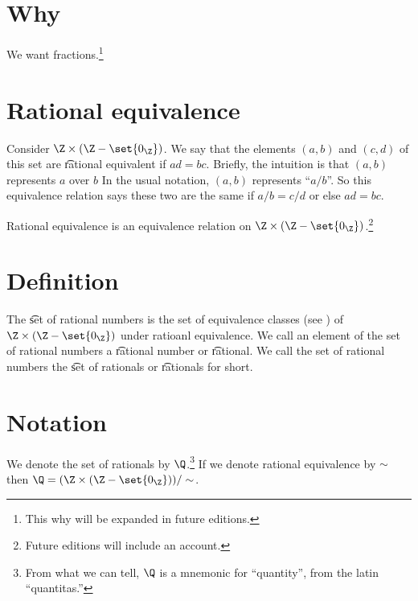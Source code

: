 

\section*{Why}

We want fractions.\footnote{This why will be expanded in future editions.}

\section*{Rational equivalence}

Consider $\Z  \times (\Z  - \set{0_{\Z }})$.
We say that the elements $(a, b)$ and $(c, d)$ of this set are \t{rational equivalent} if $ad = bc$.
Brieﬂy, the intuition is that $(a, b)$ represents $a$ over $b$
In the usual notation, $(a, b)$ represents ``$a/b$''.
So this equivalence relation says these two are the same if $a/b = c/d$ or else $ad= bc$.

\begin{proposition}
Rational equivalence is an equivalence relation on $\Z \times (\Z  - \set{0_{\Z }})$.\footnote{Future editions will include an account.}

\end{proposition}

\section*{Definition}

The \t{set of rational numbers} is the set of equivalence classes (see ) of $\Z  \times (\Z  - \set{0_{\Z }})$ under ratioanl equivalence.
We call an element of the set of rational numbers a \t{rational number} or \t{rational}.
We call the set of rational numbers the \t{set of rationals} or \t{rationals} for short.

\section*{Notation}

We denote the set of rationals by $\Q $.\footnote{From what we can tell, $\Q $ is a mnemonic for ``quantity'', from the latin ``quantitas.''}
If we denote rational equivalence by $\sim$ then $\Q  = (\Z \times (\Z  - \set{0_{\Z }}))/\sim$.

\blankpage